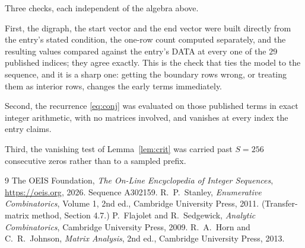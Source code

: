 \documentclass[11pt,a4paper]{article}
\theoremstyle{plain}
\theoremstyle{definition}
\begin{document}
Three checks, each independent of the algebra above.

First, the digraph, the start vector and the end vector were built directly from the
entry's stated condition, the one-row count computed separately, and the resulting values
compared against the entry's DATA at every one of the $29$ published indices; they
agree exactly. This is the check that ties the model to the sequence, and it is a sharp one:
getting the boundary rows wrong, or treating them as interior rows, changes the early terms
immediately.

Second, the recurrence \eqref{eq:conj} was evaluated on those published terms in exact
integer arithmetic, with no matrices involved, and vanishes at every index the entry claims.

Third, the vanishing test of Lemma~\ref{lem:crit} was carried past $S=256$ consecutive
zeros rather than to a sampled prefix.

\begin{thebibliography}{9}
 The OEIS Foundation, \emph{The On-Line Encyclopedia of Integer
Sequences}, \url{https://oeis.org}, 2026. Sequence A302159.
 R.~P.~Stanley, \emph{Enumerative Combinatorics}, Volume 1, 2nd ed.,
Cambridge University Press, 2011. (Transfer-matrix method, Section 4.7.)
 P.~Flajolet and R.~Sedgewick, \emph{Analytic Combinatorics}, Cambridge
University Press, 2009.
 R.~A.~Horn and C.~R.~Johnson, \emph{Matrix Analysis}, 2nd ed., Cambridge
University Press, 2013.
\end{thebibliography}
\end{document}
